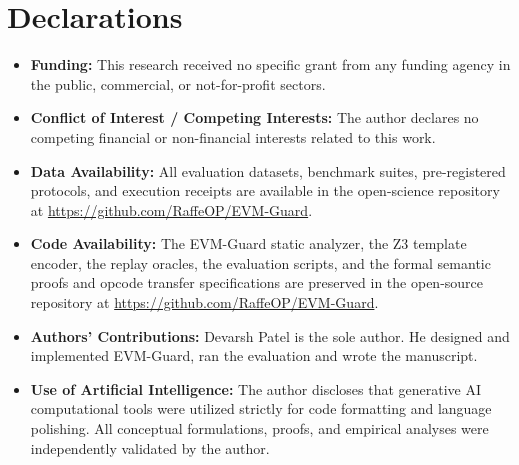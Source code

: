 \documentclass[pdflatex,sn-mathphys]{sn-jnl}
\theoremstyle{thmstyleone}
\theoremstyle{thmstyletwo}
\begin{document}
\section*{Declarations}
\begin{itemize}
    \item \textbf{Funding:} This research received no specific grant from any funding agency in the public, commercial, or not-for-profit sectors.
    \item \textbf{Conflict of Interest / Competing Interests:} The author declares no competing financial or non-financial interests related to this work.
    \item \textbf{Data Availability:} All evaluation datasets, benchmark suites, pre-registered protocols, and execution receipts are available in the open-science repository at \url{https://github.com/RaffeOP/EVM-Guard}.
    \item \textbf{Code Availability:} The EVM-Guard static analyzer, the Z3 template encoder, the replay oracles, the evaluation scripts, and the formal semantic proofs and opcode transfer specifications are preserved in the open-source repository at \url{https://github.com/RaffeOP/EVM-Guard}.
    \item \textbf{Authors' Contributions:} Devarsh Patel is the sole author. He designed and implemented EVM-Guard, ran the evaluation and wrote the manuscript.
    \item \textbf{Use of Artificial Intelligence:} The author discloses that generative AI computational tools were utilized strictly for code formatting and language polishing. All conceptual formulations, proofs, and empirical analyses were independently validated by the author.
\end{itemize}


\end{document}
